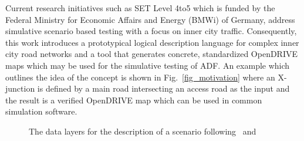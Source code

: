 \documentclass[a4paper, 10pt, conference]{ieeeconf}      %
\begin{document}
Current research initiatives such as SET Level 4to5 which is funded by the Federal Ministry for Economic Affairs and Energy (BMWi) of Germany, address simulative scenario based testing with a focus on inner city traffic. Consequently, this work introduces a prototypical logical description language for complex inner city road networks and a tool that generates concrete, standardized OpenDRIVE maps which may be used for the simulative testing of ADF. An example which outlines the idea of the concept is shown in Fig.~\ref{fig_motivation} where an X-junction is defined by a main road intersecting an access road as the input and the result is a verified OpenDRIVE map which can be used in common simulation software.

\begin{figure}[t]
	\caption{The data layers for the description of a scenario following~\cite{bock2018data} and~\cite{bagschik2018ontology}}
	\label{fig:datalayers}
\end{figure}
\end{document}
